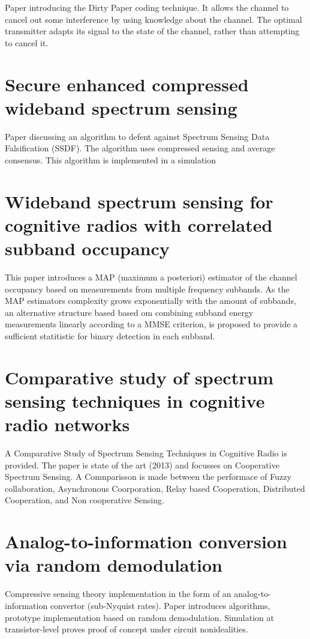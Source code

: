 \documentclass[report, oneside, a4paper, openany]{memoir}
\begin{document}
Paper introducing the Dirty Paper coding technique. It allows the channel to cancel out some interference by using knowledge about the channel. The optimal transmitter adapts its signal to the state of the channel, rather than attempting to cancel it.
\section{Secure enhanced compressed wideband spectrum sensing \cite{gang2012secure}}
Paper discussing an algorithm to defent against Spectrum Sensing Data Falsification (SSDF). The algorithm uses compressed sensing and average consensus. This algorithm is implemented in a simulation
\section{Wideband spectrum sensing for cognitive radios with correlated subband occupancy \cite{hossain2011wideband}}
This paper introduces a MAP (maximum a posteriori) estimator of the channel occupancy based on measurements from multiple frequency subbands.
As the MAP estimators complexity grows exponentially with the amount of subbands, an alternative structure based based om combining subband energy measurements linearly according to a MMSE criterion, is proposed to provide a sufficient statitistic for binary detection in each subband.
\section{Comparative study of spectrum sensing techniques in cognitive radio networks \cite{khan2013comparative}}
%
A Comparative Study of Spectrum Sensing Techniques in Cognitive Radio is provided. The paper is state of the art (2013) and focusses on Cooperative Spectrum Sensing. A Comnparisson is made between the performace of Fuzzy collaboration, Asynchronous Coorporation, Relay based Cooperation, Distributed Cooperation, and Non cooperative Sensing.
\section{Analog-to-information conversion via random demodulation \cite{kirolos2006analog}}

Compressive sensing theory implementation in the form of an analog-to-information convertor (sub-Nyquist rates). Paper introduces algorithms, prototype implementation based on random demodulation. Simulation at transistor-level proves proof of concept under circuit nonidealities.
\end{document}
